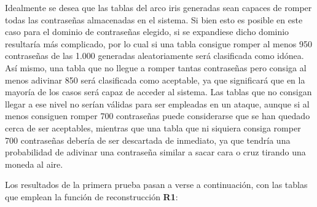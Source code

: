 \documentclass[12pt,spanish,listoffigures,listoftables,listofalgorithms]{tfgetsinf}
\begin{document}
Idealmente se desea que las tablas del arco iris generadas sean capaces de romper todas las contraseñas almacenadas en el sistema. Si bien esto es posible en este caso para el dominio de contraseñas elegido, si se expandiese dicho dominio resultaría más complicado, por lo cual si una tabla consigue romper al menos 950 contraseñas de las 1.000 generadas aleatoriamente será clasificada como idónea. Así mismo, una tabla que no llegue a romper tantas contraseñas pero consiga al menos adivinar 850 será clasificada como aceptable, ya que significará que en la mayoría de los casos será capaz de acceder al sistema. Las tablas que no consigan llegar a ese nivel no serían válidas para ser empleadas en un ataque, aunque si al menos consiguen romper 700 contraseñas puede considerarse que se han quedado cerca de ser aceptables, mientras que una tabla que ni siquiera consiga romper 700 contraseñas debería de ser descartada de inmediato, ya que tendría una probabilidad de adivinar una contraseña similar a sacar cara o cruz tirando una moneda al aire.

Los resultados de la primera prueba pasan a verse a continuación, con las tablas que emplean la función de reconstrucción \textbf{R1}:
\end{document}
